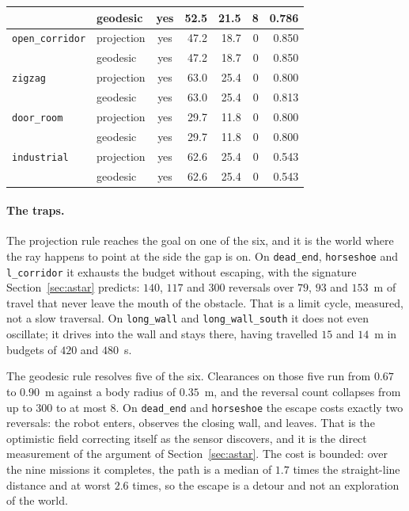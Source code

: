 \documentclass[11pt,a4paper]{article}
\begin{document}
\begin{table}[!ht]
\begin{tabular}{llcrrrr}
                                         & geodesic   & yes             &   52.5 &  21.5 &    8 & 0.786 \\
    \midrule\midrule
    \texttt{open\_corridor}              & projection & yes             &   47.2 &  18.7 &    0 & 0.850 \\
                                         & geodesic   & yes             &   47.2 &  18.7 &    0 & 0.850 \\
    \midrule
    \texttt{zigzag}                      & projection & yes             &   63.0 &  25.4 &    0 & 0.800 \\
                                         & geodesic   & yes             &   63.0 &  25.4 &    0 & 0.813 \\
    \midrule
    \texttt{door\_room}                  & projection & yes             &   29.7 &  11.8 &    0 & 0.800 \\
                                         & geodesic   & yes             &   29.7 &  11.8 &    0 & 0.800 \\
    \midrule
    \texttt{industrial}                  & projection & yes             &   62.6 &  25.4 &    0 & 0.543 \\
                                         & geodesic   & yes             &   62.6 &  25.4 &    0 & 0.543 \\
    \bottomrule
  \end{tabular}
\end{table}

\paragraph{The traps.} The projection rule reaches the goal on one of the six, and it is the world where
the ray happens to point at the side the gap is on. On \texttt{dead\_end}, \texttt{horseshoe} and
\texttt{l\_corridor} it exhausts the budget without escaping, with the signature Section~\ref{sec:astar}
predicts: $140$, $117$ and $300$ reversals over $79$, $93$ and $153$~m of travel that never leave the mouth
of the obstacle. That is a limit cycle, measured, not a slow traversal. On \texttt{long\_wall} and
\texttt{long\_wall\_south} it does not even oscillate; it drives into the wall and stays there, having
travelled $15$ and $14$~m in budgets of $420$ and $480$~s.

The geodesic rule resolves five of the six. Clearances on those five run from $0.67$ to $0.90$~m against a
body radius of $0.35$~m, and the reversal count collapses from up to $300$ to at most $8$. On
\texttt{dead\_end} and \texttt{horseshoe} the escape costs exactly two reversals: the robot enters, observes
the closing wall, and leaves. That is the optimistic field correcting itself as the sensor discovers, and it
is the direct measurement of the argument of Section~\ref{sec:astar}. The cost is bounded: over the nine
missions it completes, the path is a median of $1.7$ times the straight-line distance and at worst $2.6$
times, so the escape is a detour and not an exploration of the world.
\end{document}
